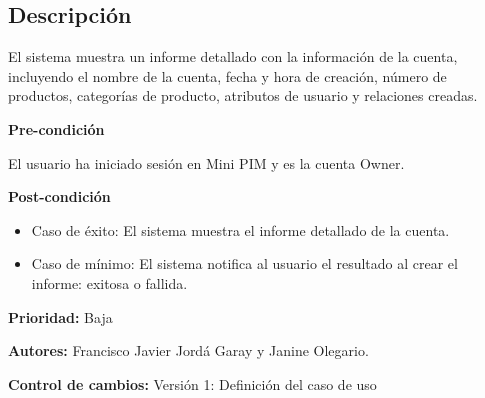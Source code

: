 
\subsection*{Descripción}
El sistema muestra un informe detallado con la información de la cuenta, incluyendo el
nombre de la cuenta, fecha y hora de creación, número de productos, categorías 
de producto, atributos de usuario y relaciones creadas.

\vspace{0.15cm}

\textbf{Pre-condición}\par
El usuario ha iniciado sesión en Mini PIM y es la cuenta Owner.\par
\vspace{0.15cm}

\textbf{Post-condición}
\begin{itemize}
    \item Caso de éxito: El sistema muestra el informe detallado de la cuenta.
    \item Caso de mínimo: El sistema notifica al usuario el resultado al crear el informe: exitosa o fallida.
\end{itemize}

\textbf{Prioridad:}
Baja
\vspace{0.15cm}

\textbf{Autores: }
Francisco Javier Jordá Garay y Janine Olegario.\par
\vspace{0.15cm}

\textbf{Control de cambios: } Versión 1: Definición del caso de uso

